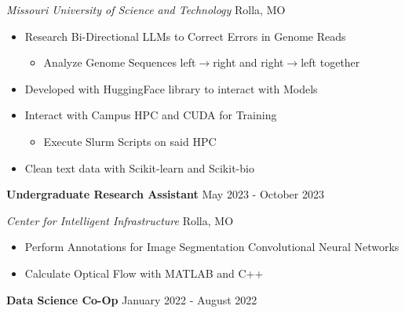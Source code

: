 \documentclass[11pt]{article}
\begin{document}
\textsl{Missouri University of Science and Technology} \hfill Rolla, MO
\begin{itemize}[noitemsep, topsep=0pt, partopsep=0pt, parsep=0pt, itemsep=0pt]
    \item Research Bi-Directional LLMs to Correct Errors in Genome Reads
    \begin{itemize}[noitemsep, topsep=0pt, partopsep=0pt, parsep=0pt, itemsep=0pt]
        \item Analyze Genome Sequences left$\rightarrow$right and right$\rightarrow$left together
    \end{itemize}
    \item Developed with HuggingFace library to interact with Models
    \item Interact with Campus HPC and CUDA for Training
    \begin{itemize}[noitemsep, topsep=0pt, partopsep=0pt, parsep=0pt, itemsep=0pt]
        \item Execute Slurm Scripts on said HPC
    \end{itemize}
    \item Clean text data with Scikit-learn and Scikit-bio
\end{itemize}


\textbf{Undergraduate Research Assistant} \hfill May 2023 - October 2023

\textsl{Center for Intelligent Infrastructure} \hfill Rolla, MO
\begin{itemize}[noitemsep, topsep=0pt, partopsep=0pt, parsep=0pt, itemsep=0pt]
    \item Perform Annotations for Image Segmentation Convolutional Neural Networks
    \item Calculate Optical Flow with MATLAB and C++
\end{itemize}


\textbf{Data Science Co-Op} \hfill January 2022 - August 2022
\end{document}
